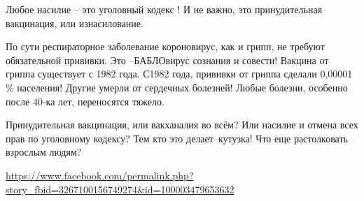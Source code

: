 \begin{itemize}
Любое насилие – это уголовный кодекс ! И не важно, это принудительная
вакцинация, или изнасилование.

По сути респираторное заболевание короновирус, как и грипп, не требуют
обязательной прививки. Это –БАБЛОвирус сознания и совести! Вакцина от гриппа
существует с 1982 года. С1982 года, прививки от гриппа сделали 0,00001 \%
населения! Другие умерли от сердечных болезней! Любые болезни, особенно после
40-ка лет, переносятся тяжело.

Принудительная вакцинация, или вакханалия во всём? Или насилие и отмена всех
прав по уголовному кодексу? Тем кто это делает–кутузка! Что еще растолковать
взрослым людям?

\url{https://www.facebook.com/permalink.php?story_fbid=3267100156749274&id=100003479653632}



\end{itemize} %
